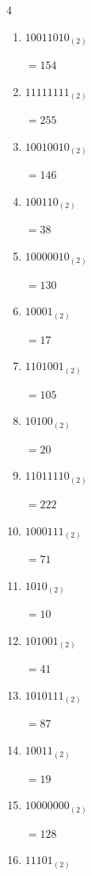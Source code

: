 \begin{multicols}{4}
\begin{enumerate}
        $=174$

  \item $10011010_{(2)}$

        $=154$

  \item $11111111_{(2)}$

        $=255$

  \item $10010010_{(2)}$

        $=146$

\columnbreak %

  \item $100110_{(2)}$

        $=38$

  \item $10000010_{(2)}$

        $=130$

  \item $10001_{(2)}$

        $=17$

  \item $1101001_{(2)}$

        $=105$

  \item $10100_{(2)}$

        $=20$

  \item $11011110_{(2)}$

        $=222$

  \item $1000111_{(2)}$

        $=71$

  \item $1010_{(2)}$

        $=10$

  \item $101001_{(2)}$

        $=41$

  \item $1010111_{(2)}$

        $=87$

  \item $10011_{(2)}$

        $=19$

  \item $10000000_{(2)}$

        $=128$

  \item $11101_{(2)}$


\end{enumerate}
\end{multicols}
